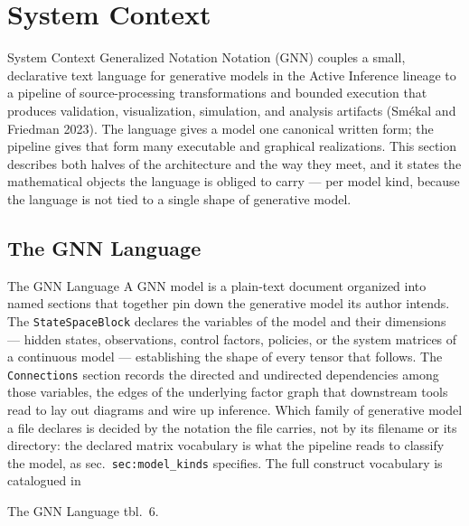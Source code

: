 \documentclass[
  ignorenonframetext,
]{beamer}
\author{\texorpdfstring{}{}}
\date{}
\begin{document}
\section{System Context}\label{sec:system_context}

\begin{frame}[allowframebreaks]{System Context}
Generalized Notation Notation (GNN) couples a small, declarative text
language for generative models in the Active Inference lineage to a
pipeline of source-processing transformations and bounded execution that
produces validation, visualization, simulation, and analysis artifacts
(Smékal and Friedman 2023). The language gives a model one canonical
written form; the pipeline gives that form many executable and graphical
realizations. This section describes both halves of the architecture and
the way they meet, and it states the mathematical objects the language
is obliged to carry --- per model kind, because the language is not tied
to a single shape of generative model.
\end{frame}

\subsection{The GNN Language}\label{the-gnn-language}

\begin{frame}{The GNN Language}
A GNN model is a plain-text document organized into named sections that
together pin down the generative model its author intends. The
\texttt{StateSpaceBlock} declares the variables of the model and their
dimensions --- hidden states, observations, control factors, policies,
or the system matrices of a continuous model --- establishing the shape
of every tensor that follows. The \texttt{Connections} section records
the directed and undirected dependencies among those variables, the
edges of the underlying factor graph that downstream tools read to lay
out diagrams and wire up inference. Which family of generative model a
file declares is decided by the notation the file carries, not by its
filename or its directory: the declared matrix vocabulary is what the
pipeline reads to classify the model, as sec.~\texttt{sec:model\_kinds}
specifies. The full construct vocabulary is catalogued in
\end{frame}

\begin{frame}{The GNN Language}
tbl.~6.
\end{frame}
\end{document}
